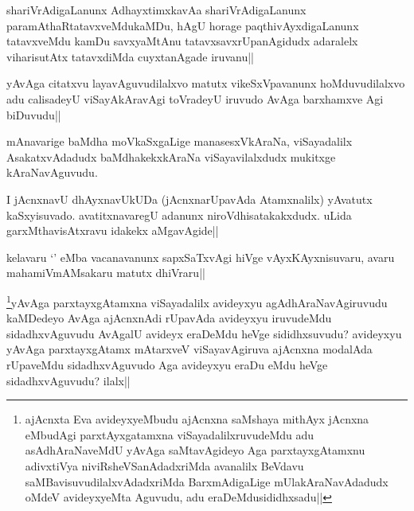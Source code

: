 
\begin{artha}
shariVrAdigaLanunx AdhayxtimxkavAa shariVrAdigaLanunx paramAthaRtatavxveMdukaMDu, hAgU horage paqthivAyxdigaLanunx tatavxveMdu kamDu savxyaMtAnu tatavxsavxrUpanAgidudx adaralelx viharisutAtx tatavxdiMda cuyxtanAgade iruvanu||
\end{artha}


\begin{artha}
yAvAga citatxvu layavAguvudilalxvo matutx vikeSxVpavanunx hoMduvudilalxvo adu calisadeyU viSayAkAravAgi toVradeyU iruvudo AvAga barxhamxve Agi biDuvudu||
\end{artha}


\begin{artha}
mAnavarige baMdha moVkaSxgaLige manasesxVkAraNa, viSayadalilx AsakatxvAdadudx baMdhakekxkAraNa viSayavilalxdudx mukitxge kAraNavAguvudu.
\end{artha}


\begin{artha}
I jAcnxnavU dhAyxnavUkUDa (jAcnxnarUpavAda Atamxnalilx) yAvatutx kaSxyisuvado. avatitxnavaregU adanunx niroVdhisatakakxdudx. uLida garxMthavisAtxravu idakekx aMgavAgide||
\end{artha}


\begin{artha}
kelavaru `\stext' eMba vacanavanunx sapxSaTxvAgi hiVge vAyxKAyxnisuvaru, avaru mahamiVmAMsakaru matutx dhiVraru||
\end{artha}


\begin{artha}
\footnote{ajAcnxta Eva avideyxyeMbudu ajAcnxna saMshaya mithAyx jAcnxna eMbudAgi parxtAyxgatamxna viSayadalilxruvudeMdu adu asAdhAraNaveMdU yAvAga saMtavAgideyo Aga parxtayxgAtamxnu adivxtiVya niviRsheVSanAdadxriMda avanalilx BeVdavu saMBavisuvudilalxvAdadxriMda BarxmAdigaLige mUlakAraNavAdadudx oMdeV avideyxyeMta Aguvudu, adu eraDeMdusididhxsadu||}yAvAga parxtayxgAtamxna viSayadalilx avideyxyu agAdhAraNavAgiruvudu kaMDedeyo AvAga ajAcnxnAdi rUpavAda avideyxyu iruvudeMdu sidadhxvAguvudu AvAgalU avideyx eraDeMdu heVge sididhxsuvudu? avideyxyu yAvAga parxtayxgAtamx mAtarxveV viSayavAgiruva ajAcnxna modalAda rUpaveMdu sidadhxvAguvudo Aga avideyxyu eraDu eMdu heVge sidadhxvAguvudu? ilalx||
\end{artha}

